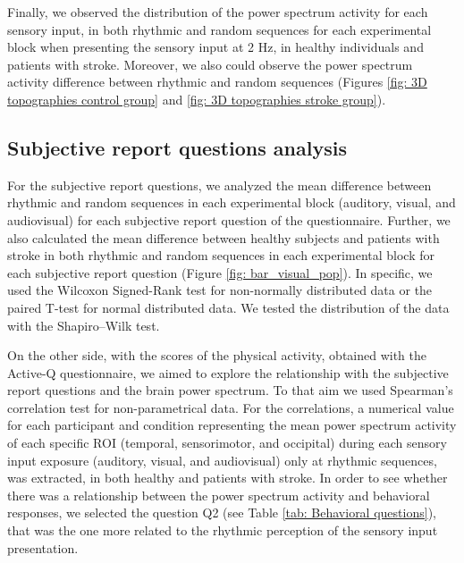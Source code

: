 Finally, we observed the distribution of the power spectrum activity for each sensory input, in both rhythmic and random sequences for each experimental block when presenting the sensory input at 2 Hz, in healthy individuals and patients with stroke. Moreover, we also could observe the power spectrum activity difference between rhythmic and random sequences (Figures \ref{fig: 3D topographies control group} and \ref{fig: 3D topographies stroke group}). 

\subsection{Subjective report questions analysis}
For the subjective report questions, we analyzed the mean difference between rhythmic and random sequences in each experimental block (auditory, visual, and audiovisual) for each subjective report question of the questionnaire. Further, we also calculated the mean difference between healthy subjects and patients with stroke in both rhythmic and random sequences in each experimental block for each subjective report question (Figure \ref{fig: bar_visual_pop}). In specific, we used the Wilcoxon Signed-Rank test for non-normally distributed data or the paired T-test for normal distributed data. We tested the distribution of the data with the Shapiro–Wilk test.

On the other side, with the scores of the physical activity, obtained with the Active-Q questionnaire, we aimed to explore the relationship with the subjective report questions and the brain power spectrum. To that aim we used Spearman’s correlation test for non-parametrical data. 
For the correlations, a numerical value for each participant and condition representing the mean power spectrum activity of each specific ROI (temporal, sensorimotor, and occipital) during each sensory input exposure (auditory, visual, and audiovisual) only at rhythmic sequences, was extracted, in both healthy and patients with stroke. 
In order to see whether there was a relationship between the power spectrum activity and behavioral responses, we selected the question Q2 (see Table \ref{tab: Behavioral questions}), that was the one more related to the rhythmic perception of the sensory input presentation. 